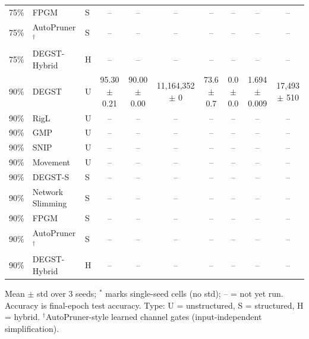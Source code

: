 \begin{table}[t]
{\begin{tabular}{lllccccccc}
75\% & FPGM & S & -- & -- & -- & -- & -- & -- & -- \\
75\% & AutoPruner$^\dagger$ & S & -- & -- & -- & -- & -- & -- & -- \\
75\% & DEGST-Hybrid & H & -- & -- & -- & -- & -- & -- & -- \\
90\% & DEGST & U & 95.30 $\pm$ 0.21 & 90.00 $\pm$ 0.00 & 11,164,352 $\pm$ 0 & 73.6 $\pm$ 0.7 & 0.0 $\pm$ 0.0 & 1.694 $\pm$ 0.009 & 17,493 $\pm$ 510 \\
90\% & RigL & U & -- & -- & -- & -- & -- & -- & -- \\
90\% & GMP & U & -- & -- & -- & -- & -- & -- & -- \\
90\% & SNIP & U & -- & -- & -- & -- & -- & -- & -- \\
90\% & Movement & U & -- & -- & -- & -- & -- & -- & -- \\
90\% & DEGST-S & S & -- & -- & -- & -- & -- & -- & -- \\
90\% & Network Slimming & S & -- & -- & -- & -- & -- & -- & -- \\
90\% & FPGM & S & -- & -- & -- & -- & -- & -- & -- \\
90\% & AutoPruner$^\dagger$ & S & -- & -- & -- & -- & -- & -- & -- \\
90\% & DEGST-Hybrid & H & -- & -- & -- & -- & -- & -- & -- \\
\bottomrule
\end{tabular}}
\par\smallskip\footnotesize Mean $\pm$ std over 3 seeds; $^{*}$ marks single-seed cells (no std); -- = not yet run. Accuracy is final-epoch test accuracy. Type: U = unstructured, S = structured, H = hybrid. $^\dagger$AutoPruner-style learned channel gates (input-independent simplification).
\end{table}
